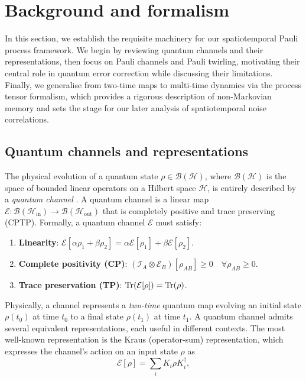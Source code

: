 \section{Background and formalism}\label{sec:background}
In this section, we establish the requisite machinery for our spatiotemporal Pauli process framework. We begin by reviewing quantum channels and their representations, then focus on Pauli channels and Pauli twirling, motivating their central role in quantum error correction while discussing their limitations. Finally, we generalise from two-time maps to multi-time dynamics via the process tensor formalism, which provides a rigorous description of non-Markovian memory and sets the stage for our later analysis of spatiotemporal noise correlations.

\subsection{Quantum channels and representations}
The physical evolution of a quantum state \(\rho \in \mathcal{B}(\mathcal{H})\), where \(\mathcal{B}(\mathcal{H})\) is the space of bounded linear operators on a Hilbert space \(\mathcal{H}\), is entirely described by a \emph{quantum channel} \cite{nielsenQuantumComputationQuantum2010}. A quantum channel is a linear map \(\mathcal{E}: \mathcal{B}(\mathcal{H}_{\mathrm{in}}) \to \mathcal{B}(\mathcal{H}_{\mathrm{out}})\) that is completely positive and trace preserving (CPTP). Formally, a quantum channel \(\mathcal{E}\) must satisfy:
\begin{enumerate}
\item \textbf{Linearity}: \(\mathcal{E}[\alpha\rho_1+\beta\rho_2]=\alpha\mathcal{E}[\rho_1]+\beta\mathcal{E}[\rho_2]\).
\item \textbf{Complete positivity (CP)}: \((\mathcal{I}_A\otimes \mathcal{E}_B)[\rho_{AB}]\geq 0 \quad \forall \rho_{AB} \ge 0\).
\item \textbf{Trace preservation (TP)}: \(\mathrm{Tr}(\mathcal{E}[\rho]) = \mathrm{Tr}(\rho)\).
\end{enumerate}
Physically, a channel represents a \emph{two-time} quantum map evolving an initial state \(\rho(t_0)\) at time \(t_0\) to a final state \(\rho(t_1)\) at time \(t_1\). A quantum channel admits several equivalent representations, each useful in different contexts. The most well-known representation is the Kraus (operator-sum) representation, which expresses the channel's action on an input state \(\rho\) as
\begin{equation}
    \mathcal{E}[\rho] = \sum_i K_i \rho K_i^\dagger,
\end{equation}
